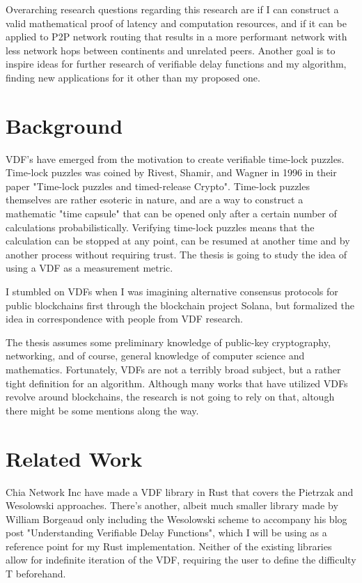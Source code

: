 \documentclass[a4paper,12pt]{article}
\begin{document}
Overarching research questions regarding this research are if I can construct a valid mathematical proof of latency and computation resources, and if it can be applied to P2P network routing that results in a more performant network with less network hops between continents and unrelated peers. Another goal is to inspire ideas for further research of verifiable delay functions and my algorithm, finding new applications for it other than my proposed one.

\section{Background}
VDF's have emerged from the motivation to create verifiable time-lock puzzles. Time-lock puzzles was coined by Rivest, Shamir, and Wagner in 1996 in their paper "Time-lock puzzles and timed-release Crypto". Time-lock puzzles themselves are rather esoteric in nature, and are a way to construct a mathematic "time capsule" that can be opened only after a certain number of calculations probabilistically. Verifying time-lock puzzles means that the calculation can be stopped at any point, can be resumed at another time and by another process without requiring trust. The thesis is going to study the idea of using a VDF as a measurement metric. 

I stumbled on VDFs when I was imagining alternative consensus protocols for public blockchains first through the blockchain project Solana, but formalized the idea in correspondence with people from VDF research. 

The thesis assumes some preliminary knowledge of public-key cryptography, networking, and of course, general knowledge of computer science and mathematics. Fortunately, VDFs are not a terribly broad subject, but a rather tight definition for an algorithm. Although many works that have utilized VDFs revolve around blockchains, the research is not going to rely on that, altough there might be some mentions along the way.

\section{Related Work}
Chia Network Inc have made a VDF library in Rust that covers the Pietrzak and Wesolowski approaches. There's another, albeit much smaller library made by William Borgeaud only including the Wesolowski scheme to accompany his blog post "Understanding Verifiable Delay Functions", which I will be using as a reference point for my Rust implementation. Neither of the existing libraries allow for indefinite iteration of the VDF, requiring the user to define the difficulty T beforehand.
\end{document}
